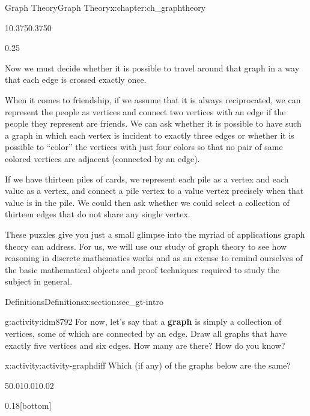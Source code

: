 \documentclass[oneside,10pt,]{book}
\newcommand{\terminology}[1]{\textbf{#1}}
\numberwithin{equation}{chapter}
\newcommand{\vtx}[2]{node[fill,circle,inner sep=0pt, minimum size=4pt,label=#1:#2]{}}
\renewcommand{\v}{\vtx{above}{}}
\begin{document}
\begin{chapterptx}{Graph Theory}{}{Graph Theory}{}{}{x:chapter:ch_graphtheory}
\begin{introduction}{}
\begin{sidebyside}{1}{0.375}{0.375}{0}
\begin{sbspanel}{0.25}
{
}%
\end{sbspanel}%
\end{sidebyside}%
\par
Now we must decide whether it is possible to travel around that graph in a way that each edge is crossed exactly once.%
\par
When it comes to friendship, if we assume that it is always reciprocated, we can represent the people as vertices and connect two vertices with an edge if the people they represent are friends.  We can ask whether it is possible to have such a graph in which each vertex is incident to exactly three edges or whether it is possible to ``color'' the vertices with just four colors so that no pair of same colored vertices are adjacent (connected by an edge).%
\par
If we have thirteen piles of cards, we represent each pile as a vertex and each value as a vertex, and connect a pile vertex to a value vertex precisely when that value is in the pile.  We could then ask whether we could select a collection of thirteen edges that do not share any single vertex.%
\par
These puzzles give you just a small glimpse into the myriad of applications graph theory can address.  For us, we will use our study of graph theory to see how reasoning in discrete mathematics works and as an excuse to remind ourselves of the basic mathematical objects and proof techniques required to study the subject in general.%
\end{introduction}%
%
%
\typeout{************************************************}
\typeout{************************************************}
%
\begin{sectionptx}{Definitions}{}{Definitions}{}{}{x:section:sec_gt-intro}
\begin{activity}{}{g:activity:idm8792}%
For now, let's say that a \terminology{graph} is simply a collection of vertices, some of which are connected by an edge.  Draw all graphs that have exactly five vertices and six edges.  How many are there?  How do you know?%
\end{activity}
\begin{activity}{}{x:activity:activity-graphdiff}%
Which (if any) of the graphs below are the same?%
\begin{sidebyside}{5}{0.01}{0.01}{0.02}%
\begin{sbspanel}{0.18}[bottom]%
\end{sbspanel}
\end{sidebyside}
\end{activity}
\end{sectionptx}
\end{chapterptx}
\end{document}
